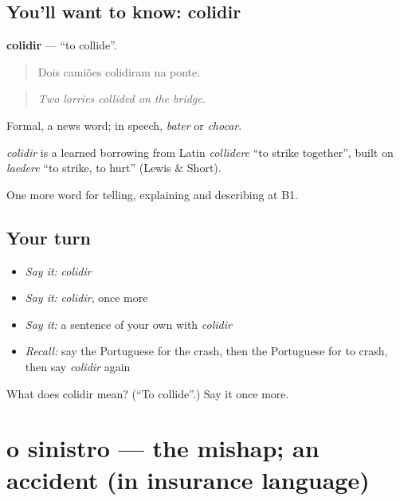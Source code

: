 \subsection*{You'll want to know: colidir}
\textbf{colidir} — \textquotedblleft{}to collide\textquotedblright{}.

\begin{quote}
Dois camiões colidiram na ponte.
\end{quote}

\begin{quote}
\emph{Two lorries collided on the bridge.}
\end{quote}

Formal, a news word; in speech, \emph{bater} or \emph{chocar}.

\begin{cousinweb}
\emph{colidir} is a learned borrowing from Latin \emph{collīdere} \textquotedblleft{}to strike together\textquotedblright{}, built on \emph{laedere} \textquotedblleft{}to strike, to hurt\textquotedblright{} (Lewis \& Short).
\end{cousinweb}

\begin{grammarlens}[title={What you've built}]
One more word for telling, explaining and describing at B1.
\end{grammarlens}

\subsection*{Your turn}
\begin{itemize}
\raggedright
  \item \emph{Say it:} \emph{colidir}
  \item \emph{Say it:} \emph{colidir}, once more
  \item \emph{Say it:} a sentence of your own with \emph{colidir}
  \item \emph{Recall:} say the Portuguese for the crash, then the Portuguese for to crash, then say \emph{colidir} again
\end{itemize}

\begin{tcolorbox}[breakable,colback=teal!4,colframe=teal!35!black,title={Before you move on}]
What does colidir mean? (\textquotedblleft{}To collide\textquotedblright{}.) Say it once more.
\end{tcolorbox}
\section[o sinistro]{o sinistro — the mishap; an accident (in insurance language)}


